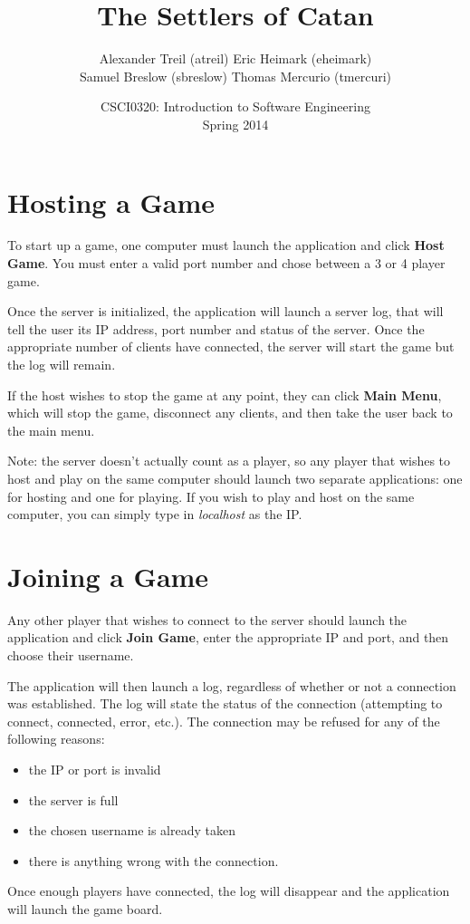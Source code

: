 \documentclass[12pt,letterpaper,titlepage]{article}
\begin{document}
\title{\textbf{The Settlers of Catan}}
\author{Alexander Treil (atreil) Eric Heimark (eheimark)\\Samuel Breslow (sbreslow) Thomas Mercurio (tmercuri)}
\date{CSCI0320: Introduction to Software Engineering\\Spring 2014}
\maketitle

\tableofcontents

\newpage
{}

\section{Hosting a Game}
To start up a game, one computer must launch the application and click \textbf{Host Game}. You must enter a valid port number and chose between a 3 or 4 player game.

Once the server is initialized, the application will launch a server log, that will tell the user its IP address, port number and status of the server. Once the appropriate number of clients have connected, the server will start the game but the log will remain.

If the host wishes to stop the game at any point, they can click \textbf{Main Menu}, which will stop the game, disconnect any clients, and then take the user back to the main menu.

Note: the server doesn't actually count as a player, so any player that wishes to host and play on the same computer should launch two separate applications: one for hosting and one for playing. If you wish to play and host on the same computer, you can simply type in \emph{localhost} as the IP.

\section{Joining a Game}
Any other player that wishes to connect to the server should launch the application and click \textbf{Join Game}, enter the appropriate IP and port, and then choose their username.

The application will then launch a log, regardless of whether or not a connection was established. The log will state the status of the connection (attempting to connect, connected, error, etc.). The connection may be refused for any of the following reasons:
\begin{itemize}
	\item the IP or port is invalid
	\item the server is full
	\item the chosen username is already taken
	\item there is anything wrong with the connection.
\end{itemize}
Once enough players have connected, the log will disappear and the application will launch the game board.
\end{document}

